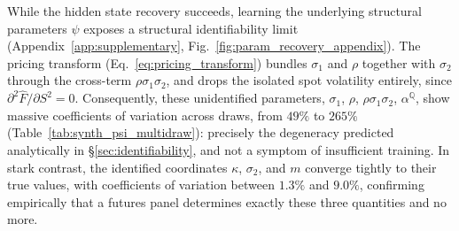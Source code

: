 \documentclass[sigconf, authorversion=true, nonacm=true]{acmart}
\begin{document}
While the hidden state recovery succeeds, learning the underlying structural parameters $\psi$ exposes a structural identifiability limit (Appendix~\ref{app:supplementary}, Fig.~\ref{fig:param_recovery_appendix}). The pricing transform (Eq.~\ref{eq:pricing_transform}) bundles $\sigma_1$ and $\rho$ together with $\sigma_2$ through the cross-term $\rho\sigma_1\sigma_2$, and drops the isolated spot volatility entirely, since $\partial^2\hat F/\partial S^2 = 0$. Consequently, these unidentified parameters, $\sigma_1$, $\rho$, $\rho\sigma_1\sigma_2$, $\alpha^{\mathbb{Q}}$, show massive coefficients of variation across draws, from $49\%$ to $265\%$ (Table~\ref{tab:synth_psi_multidraw}): precisely the degeneracy predicted analytically in \S\ref{sec:identifiability}, and not a symptom of insufficient training. In stark contrast, the identified coordinates $\kappa$, $\sigma_2$, and $m$ converge tightly to their true values, with coefficients of variation between $1.3\%$ and $9.0\%$, confirming empirically that a futures panel determines exactly these three quantities and no more.
\end{document}
